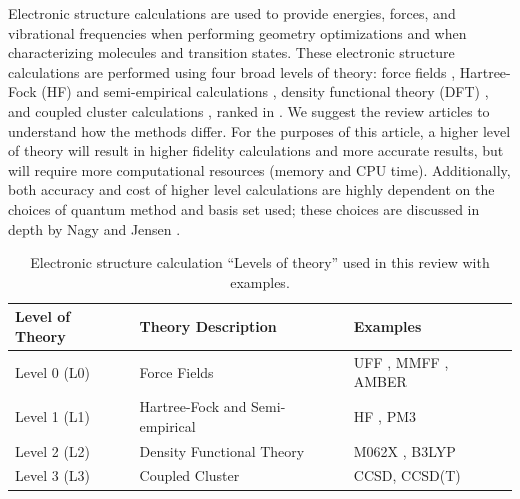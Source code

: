 \documentclass[preprint, 11pt]{elsarticle} %
\begin{document}
Electronic structure calculations are used to provide energies, forces, and vibrational frequencies when performing geometry optimizations and when characterizing molecules and transition states.
These electronic structure calculations are performed using four broad levels of theory: 
force fields \cite{Harrison:2018, gonzalez:2011}, 
Hartree-Fock (HF)  \cite{Echenique:2007} and semi-empirical calculations \cite{Christensen:2016}, 
density functional theory (DFT) \cite{Mardirossian:2017mp}, 
and coupled cluster calculations \cite{Sneskov:2012},
ranked in .
We suggest the review articles  \citep{Harrison:2018, gonzalez:2011, Echenique:2007, Christensen:2016, Mardirossian:2017mp, Sneskov:2012} to understand how the methods differ.
For the purposes of this article, a higher level of theory will result in higher fidelity calculations and more accurate results,
but will require more computational resources (memory and CPU time).
Additionally, both accuracy and cost of higher level calculations are highly dependent on the choices of quantum method and basis set used; these choices are discussed in depth by Nagy and Jensen \cite{Nagy:2017}.

\begin{table}[htbp]
    \centering
    \begin{tabular}{l | l | l}
        Level of Theory & Theory Description & Examples \\
        \hline
        Level 0 (L0) & Force Fields & UFF \cite{UFF:1992}, MMFF \cite{MMFF94:1996}, AMBER \cite{SalomonFerrer:2012} \\
        Level 1 (L1) & Hartree-Fock and Semi-empirical& HF \cite{HF:1987}, PM3 \cite{PM3:1989} \\
        Level 2 (L2) & Density Functional Theory & M062X \cite{Zhao:2007}, B3LYP \cite{Becke:1993} \\
        Level 3 (L3) & Coupled Cluster & CCSD, CCSD(T) \cite{bartlett:2007}
    \end{tabular}
    \caption{Electronic structure calculation ``Levels of theory''  used in this review with examples.}
    \label{tab:electronic_structures}
\end{table}
\end{document}
